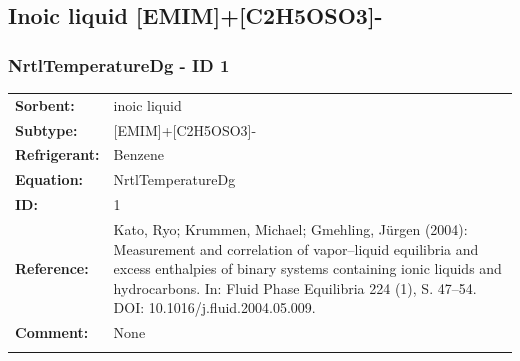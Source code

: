 \subsection{Inoic liquid [EMIM]+[C2H5OSO3]-}
%
\subsubsection{NrtlTemperatureDg - ID 1}
%
\begin{tabular}[l]{|lp{11.5cm}|}
\hline
\addlinespace

\textbf{Sorbent:} & inoic liquid \\
\textbf{Subtype:} & [EMIM]+[C2H5OSO3]- \\
\textbf{Refrigerant:} & Benzene \\
\textbf{Equation:} & NrtlTemperatureDg \\
\textbf{ID:} & 1 \\
\textbf{Reference:} & Kato, Ryo; Krummen, Michael; Gmehling, Jürgen (2004): Measurement and correlation of vapor–liquid equilibria and excess enthalpies of binary systems containing ionic liquids and hydrocarbons. In: Fluid Phase Equilibria 224 (1), S. 47–54. DOI: 10.1016/j.fluid.2004.05.009. \\
\textbf{Comment:} & None \\

\addlinespace
\hline
\end{tabular}
\newline


